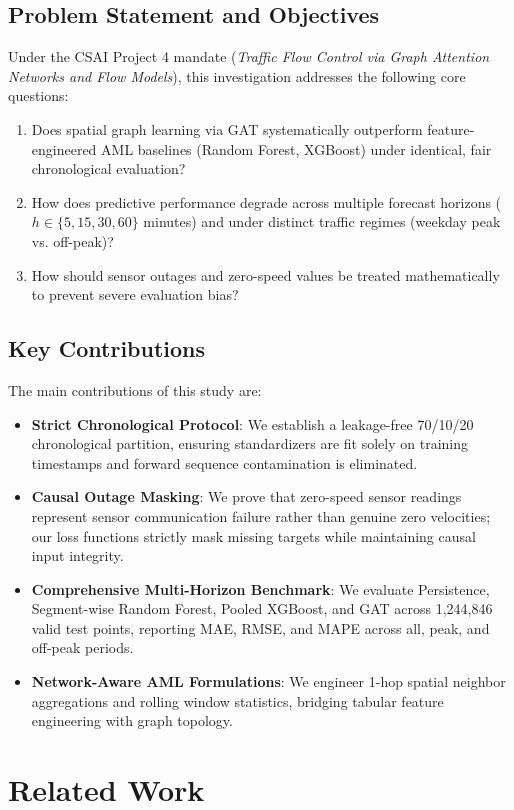 \documentclass[conference]{IEEEtran}
\begin{document}
\subsection{Problem Statement and Objectives}
Under the CSAI Project 4 mandate (\textit{Traffic Flow Control via Graph Attention Networks and Flow Models}), this investigation addresses the following core questions:
\begin{enumerate}
    \item Does spatial graph learning via GAT systematically outperform feature-engineered AML baselines (Random Forest, XGBoost) under identical, fair chronological evaluation?
    \item How does predictive performance degrade across multiple forecast horizons ($h \in \{5, 15, 30, 60\}$ minutes) and under distinct traffic regimes (weekday peak vs. off-peak)?
    \item How should sensor outages and zero-speed values be treated mathematically to prevent severe evaluation bias?
\end{enumerate}

\subsection{Key Contributions}
The main contributions of this study are:
\begin{itemize}
    \item \textbf{Strict Chronological Protocol}: We establish a leakage-free 70/10/20 chronological partition, ensuring standardizers are fit solely on training timestamps and forward sequence contamination is eliminated.
    \item \textbf{Causal Outage Masking}: We prove that zero-speed sensor readings represent sensor communication failure rather than genuine zero velocities; our loss functions strictly mask missing targets while maintaining causal input integrity.
    \item \textbf{Comprehensive Multi-Horizon Benchmark}: We evaluate Persistence, Segment-wise Random Forest, Pooled XGBoost, and GAT across 1,244,846 valid test points, reporting MAE, RMSE, and MAPE across all, peak, and off-peak periods.
    \item \textbf{Network-Aware AML Formulations}: We engineer 1-hop spatial neighbor aggregations and rolling window statistics, bridging tabular feature engineering with graph topology.
\end{itemize}

\section{Related Work}
\end{document}
